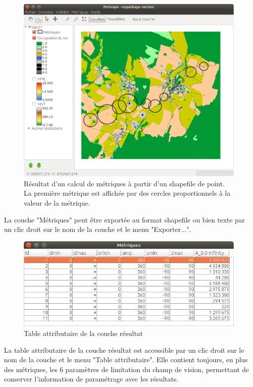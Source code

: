 \documentclass{report}
\begin{document}
\begin{figure}[H]
	\includegraphics[scale=0.5]{img/metric_result_vect-fr.png} 
	\caption{Résultat d'un calcul de métriques à partir d'un shapefile de point. La première métrique est affichée par des cercles proportionnels à la valeur de la métrique.}
	\label{metric_result_vect}
\end{figure}

La couche "Métriques" peut être exportée au format shapefile ou bien texte par un clic droit sur le nom de la couche et le menu "Exporter...".

\begin{figure}[H]
	\includegraphics[scale=0.5]{img/metric_result_attr-fr.png} 
	\caption{Table attributaire de la couche résultat}
	\label{metric_result_attr}
\end{figure}

La table attributaire de la couche résultat est accessible par un clic droit sur le nom de la couche et le menu "Table attributaire". Elle contient toujours, en plus des métriques, les 6 paramètres de limitation du champ de vision, permettant de conserver l'information de paramétrage avec les résultats.
\end{document}
